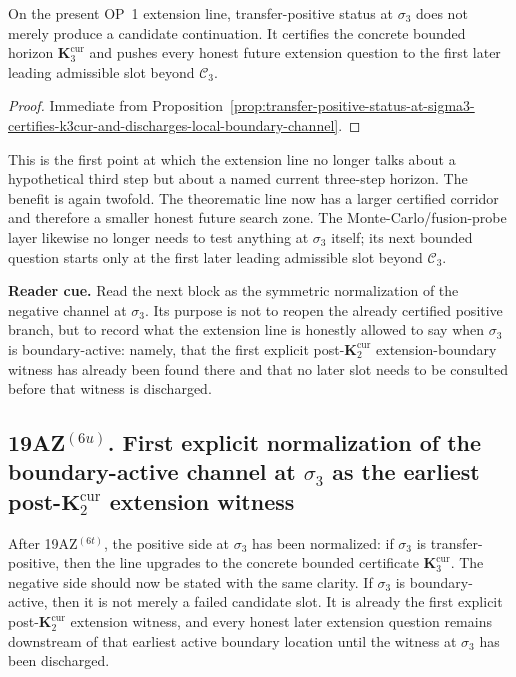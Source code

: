 \begin{corollary}
\label{cor:positive-channel-at-sigma3-upgrades-certified-horizon-from-k2cur-to-k3cur}
On the present OP~1 extension line, transfer-positive status at $\sigma_3$ does not merely produce a candidate continuation. It certifies the concrete bounded horizon $\mathbf K_3^{\mathrm{cur}}$ and pushes every honest future extension question to the first later leading admissible slot beyond $\mathcal C_3$.
\end{corollary}

\begin{proof}
Immediate from Proposition~\ref{prop:transfer-positive-status-at-sigma3-certifies-k3cur-and-discharges-local-boundary-channel}.
\end{proof}

\begin{remark}
\label{rem:what-certifying-k3cur-now-buys}
This is the first point at which the extension line no longer talks about a hypothetical third step but about a named current three-step horizon. The benefit is again twofold. The theorematic line now has a larger certified corridor and therefore a smaller honest future search zone. The Monte-Carlo/fusion-probe layer likewise no longer needs to test anything at $\sigma_3$ itself; its next bounded question starts only at the first later leading admissible slot beyond $\mathcal C_3$.
\end{remark}


\noindent\textbf{Reader cue.} Read the next block as the symmetric normalization of the negative channel at $\sigma_3$. Its purpose is not to reopen the already certified positive branch, but to record what the extension line is honestly allowed to say when $\sigma_3$ is boundary-active: namely, that the first explicit post-$\mathbf K_2^{\mathrm{cur}}$ extension-boundary witness has already been found there and that no later slot needs to be consulted before that witness is discharged.

\subsection*{19AZ$^{(6u)}$. First explicit normalization of the boundary-active channel at $\sigma_3$ as the earliest post-$\mathbf K_2^{\mathrm{cur}}$ extension witness}
\label{sec:first-explicit-normalization-of-boundary-active-channel-at-sigma3-as-earliest-post-k2cur-extension-witness}
After 19AZ$^{(6t)}$, the positive side at $\sigma_3$ has been normalized: if $\sigma_3$ is transfer-positive, then the line upgrades to the concrete bounded certificate $\mathbf K_3^{\mathrm{cur}}$. The negative side should now be stated with the same clarity. If $\sigma_3$ is boundary-active, then it is not merely a failed candidate slot. It is already the first explicit post-$\mathbf K_2^{\mathrm{cur}}$ extension witness, and every honest later extension question remains downstream of that earliest active boundary location until the witness at $\sigma_3$ has been discharged.

